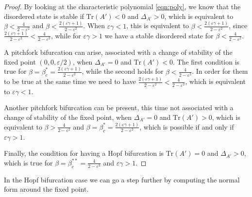 \documentclass[a4paper,10pt,leqno]{amsart}
\theoremstyle{plain}
\begin{document}
\begin{proof}
By looking at the characteristic polynomial \eqref{eqn:poly}, we know that the disordered state is stable if $\text{Tr}(A') < 0$ and $\Delta_{A'} > 0$, which is equivalent to $\beta < \frac{4}{2-\varepsilon^2}$ and $\beta < \frac{2(\varepsilon \gamma + 1)}{2-\varepsilon^2}$.
When $\varepsilon \gamma < 1$, this is equivalent to $\beta <  \frac{2(\varepsilon \gamma + 1)}{2-\varepsilon^2}$, since $ \frac{2(\varepsilon \gamma + 1)}{2-\varepsilon^2} < \frac{4}{2-\varepsilon^2}$, while for $\varepsilon \gamma > 1$ we have a stable disordered state for $\beta < \frac{4}{2-\varepsilon^2}$.

A pitchfork bifurcation can arise, associated with a change of stability of the fixed point $(0,0,\varepsilon/2)$, when $ \Delta_{A'} = 0$ and $\text{Tr}(A') < 0$.
The first condition is true for $\beta = \beta^{*}_c = \frac{2(\varepsilon \gamma + 1)}{2-\varepsilon^2}$, while the second holds for $\beta <  \frac{4}{2-\varepsilon^2}$. 
In order for them to be true at the same time we need to have $ \frac{2(\varepsilon \gamma + 1)}{2-\varepsilon^2} < \frac{4}{2-\varepsilon^2}$, which is equivalent to $\varepsilon \gamma < 1$.

Another pitchfork bifurcation can be present, this time not associated with a change of stability of the fixed point, when  $\Delta_{A'} = 0$ and $\text{Tr}(A') > 0$, 
which is equivalent to $\beta > \frac{4}{2-\varepsilon^2}$ and $\beta = \beta^{*}_c = \frac{2(\varepsilon \gamma + 1)}{2-\varepsilon^2}$, which is possible if and only if $\varepsilon \gamma > 1$.

Finally, the condition for having a Hopf bifurcation is $\text{Tr}(A')  = 0$ and $\Delta_{A'} > 0$, which is true for $\beta = \beta^{**}_c= \frac{4}{2-\varepsilon^2}$ and $\varepsilon \gamma > 1$. 
\end{proof}


In the Hopf bifurcation case we can go a step further by computing the normal form around the fixed point.
\end{document}
